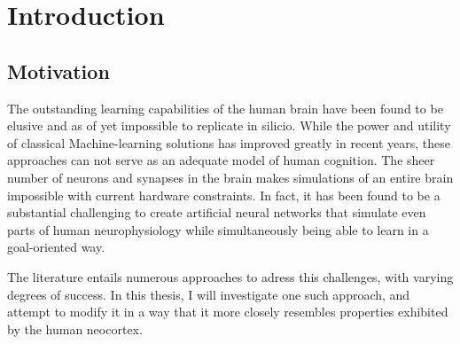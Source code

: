 
\chapter{Introduction}



\section{Motivation}


The outstanding learning capabilities of the human brain have been found to be elusive
and as of yet impossible to replicate in silicio. While the power and utility of classical
Machine-learning solutions has improved greatly in recent years, these approaches can not serve as 
an adequate model of human cognition. 
The sheer number of neurons and synapses in the brain makes simulations
of an entire brain impossible with current hardware constraints. 
In fact, it has been found to be a substantial challenging to
create artificial neural networks that simulate even parts of human neurophysiology while simultaneously being
able to learn in a goal-oriented way. 



The literature entails numerous approaches to adress this challenges, with varying degrees of success. In this thesis,
I will investigate one such approach, and attempt to modify it in a way that it more closely resembles properties 
exhibited by the human neocortex.